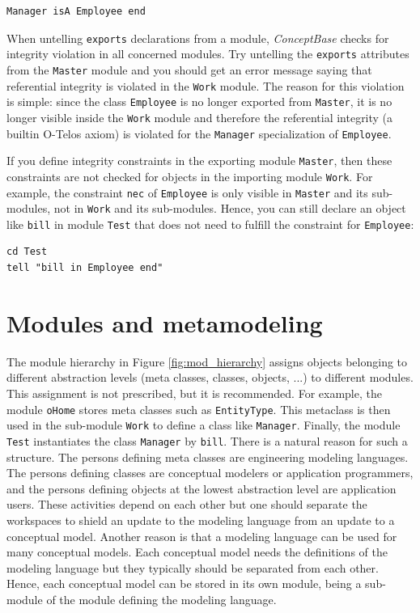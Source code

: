 \begin{verbatim}
Manager isA Employee end
\end{verbatim}

When untelling {\tt exports} declarations from  a module,
{\em ConceptBase} checks for integrity violation in all concerned modules.
Try untelling the {\tt exports} attributes from the {\tt Master} module
and you should get an error message saying that referential integrity is violated
in the {\tt Work} module. The reason for this violation is simple: since the class
{\tt Employee} is no longer exported from {\tt Master}, it is no longer visible
inside the {\tt Work} module and therefore the referential integrity (a builtin O-Telos axiom)
is violated for the {\tt Manager} specialization of {\tt Employee}.

If you define integrity constraints in the exporting module {\tt Master}, then
these constraints are not checked for objects in the importing module {\tt Work}.
For example, the constraint {\tt nec} of {\tt Employee} is only visible in {\tt Master}
and its sub-modules, not in {\tt Work} and its sub-modules.
Hence, you can still declare an object like {\tt bill} in module {\tt Test} that does not need to
fulfill the constraint for {\tt Employee}: 

\begin{verbatim}
cd Test
tell "bill in Employee end"
\end{verbatim}

\section{Modules and metamodeling} \label{sec:metamodule}

The module hierarchy in Figure \ref{fig:mod_hierarchy} assigns objects belonging to different
abstraction levels (meta classes, classes, objects, ...) to different modules. This assignment
is not prescribed, but it is recommended. For example, the module {\tt oHome} stores
meta classes such as {\tt EntityType}. This metaclass is then used in the sub-module
{\tt Work} to define a class like {\tt Manager}. Finally, the module {\tt Test} instantiates
the class {\tt Manager} by {\tt bill}. There is a natural reason for such a structure. The
persons defining meta classes are engineering modeling languages. The persons defining 
classes are conceptual modelers or application programmers, and the persons defining objects
at the lowest abstraction level are application users. These activities depend on each other but
one should separate the workspaces to shield an update to the modeling language
from an update to a conceptual model. Another reason is that a modeling language 
can be used for many conceptual models. Each conceptual model needs the definitions of the
modeling language but they typically should be separated from each other. Hence, each conceptual
model can be stored in its own module, being a sub-module of the module defining the 
modeling language.

